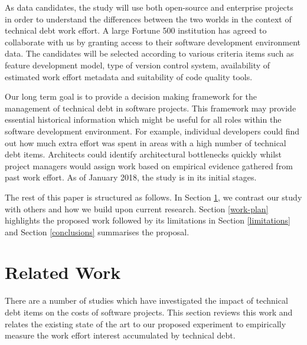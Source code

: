 As data candidates, the study will use both open-source and enterprise projects
in order to understand the differences between the two worlds in the context of
technical debt work effort. A large Fortune 500 institution has agreed to
collaborate with us by granting access to their software development environment
data. The candidates will be selected according to various criteria items such
as feature development model, type of version control system, availability of
estimated work effort metadata and suitability of code quality tools. 

Our long term goal is to provide a decision making framework for the management of
technical debt in software projects. This framework may provide essential
historical information which might be useful for all roles within the software
development environment. For example, individual developers could find out how
much extra effort was spent in areas with a high number of technical debt items.
Architects could identify architectural bottlenecks quickly whilst project
managers would assign work based on empirical evidence gathered from past work
effort. As of January 2018, the study is in its initial stages.

The rest of this paper is structured as follows.  In Section \ref{related-work},
we contrast our study with others and how we build upon current
research. Section \ref{work-plan} highlights the proposed work followed by its
limitations in Section \ref{limitations} and Section \ref{conclusions}
summarises the proposal.

\section{Related Work}
\label{related-work}

There are a number of studies which have investigated the impact of technical
debt items on the costs of software projects.  This section reviews this work
and relates the existing state of the art to our proposed experiment to
empirically measure the work effort interest accumulated by technical debt.

